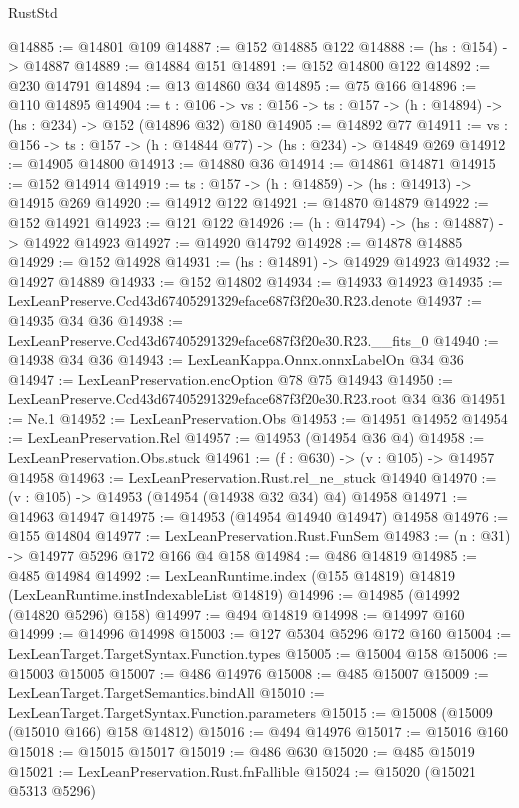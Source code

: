 \begin{lexlean}{RustStd}
\begin{coremodule}
@14885 := @14801 @109
@14887 := @152 @14885 @122
@14888 := (hs : @154) -> @14887
@14889 := @14884 @151
@14891 := @152 @14800 @122
@14892 := @230 @14791
@14894 := @13 @14860 @34
@14895 := @75 @166
@14896 := @110 @14895
@14904 := {t : @106} ->
  {vs : @156} -> {ts : @157} -> (h : @14894) -> (hs : @234) -> @152 (@14896 @32) @180
@14905 := @14892 @77
@14911 := {vs : @156} -> {ts : @157} -> (h : @14844 @77) -> (hs : @234) -> @14849 @269
@14912 := @14905 @14800
@14913 := @14880 @36
@14914 := @14861 @14871
@14915 := @152 @14914
@14919 := {ts : @157} -> (h : @14859) -> (hs : @14913) -> @14915 @269
@14920 := @14912 @122
@14921 := @14870 @14879
@14922 := @152 @14921
@14923 := @121 @122
@14926 := (h : @14794) -> (hs : @14887) -> @14922 @14923
@14927 := @14920 @14792
@14928 := @14878 @14885
@14929 := @152 @14928
@14931 := (hs : @14891) -> @14929 @14923
@14932 := @14927 @14889
@14933 := @152 @14802
@14934 := @14933 @14923
@14935 := LexLeanPreserve.Ccd43d67405291329eface687f3f20e30.R23.denote
@14937 := @14935 @34 @36
@14938 := LexLeanPreserve.Ccd43d67405291329eface687f3f20e30.R23.__fits_0
@14940 := @14938 @34 @36
@14943 := LexLeanKappa.Onnx.onnxLabelOn @34 @36
@14947 := LexLeanPreservation.encOption @78 @75 @14943
@14950 := LexLeanPreserve.Ccd43d67405291329eface687f3f20e30.R23.root @34 @36
@14951 := Ne.{1}
@14952 := LexLeanPreservation.Obs
@14953 := @14951 @14952
@14954 := LexLeanPreservation.Rel
@14957 := @14953 (@14954 @36 @4)
@14958 := LexLeanPreservation.Obs.stuck
@14961 := (f : @630) -> (v : @105) -> @14957 @14958
@14963 := LexLeanPreservation.Rust.rel_ne_stuck @14940
@14970 := (v : @105) -> @14953 (@14954 (@14938 @32 @34) @4) @14958
@14971 := @14963 @14947
@14975 := @14953 (@14954 @14940 @14947) @14958
@14976 := @155 @14804
@14977 := LexLeanPreservation.Rust.FunSem
@14983 := (n : @31) -> @14977 @5296 @172 @166 @4 @158
@14984 := @486 @14819
@14985 := @485 @14984
@14992 := LexLeanRuntime.index (@155 @14819) @14819 (LexLeanRuntime.instIndexableList @14819)
@14996 := @14985 (@14992 (@14820 @5296) @158)
@14997 := @494 @14819
@14998 := @14997 @160
@14999 := @14996 @14998
@15003 := @127 @5304 @5296 @172 @160
@15004 := LexLeanTarget.TargetSyntax.Function.types
@15005 := @15004 @158
@15006 := @15003 @15005
@15007 := @486 @14976
@15008 := @485 @15007
@15009 := LexLeanTarget.TargetSemantics.bindAll
@15010 := LexLeanTarget.TargetSyntax.Function.parameters
@15015 := @15008 (@15009 (@15010 @166) @158 @14812)
@15016 := @494 @14976
@15017 := @15016 @160
@15018 := @15015 @15017
@15019 := @486 @630
@15020 := @485 @15019
@15021 := LexLeanPreservation.Rust.fnFallible
@15024 := @15020 (@15021 @5313 @5296)

\end{coremodule}
\end{lexlean}
